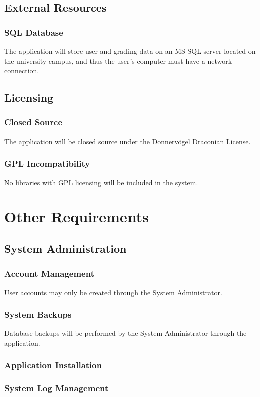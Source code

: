 \documentclass{article}
\begin{document}
\subsection{External Resources}
\subsubsection{SQL Database}
The application will store user and grading data on an MS SQL server located on
the university campus, and thus the user's computer must have a network connection.
\subsection{Licensing}
\subsubsection{Closed Source}
The application will be closed source under the Donnervögel Draconian License.
\subsubsection{GPL Incompatibility}
No libraries with GPL licensing will be included in the system.

\section{Other Requirements}
\subsection{System Administration}
\subsubsection{Account Management}
User accounts may only be created through the System Administrator.
\subsubsection{System Backups}
Database backups will be performed by the System Administrator
through the application.
\subsubsection{Application Installation}
\subsubsection{System Log Management}
\end{document}
